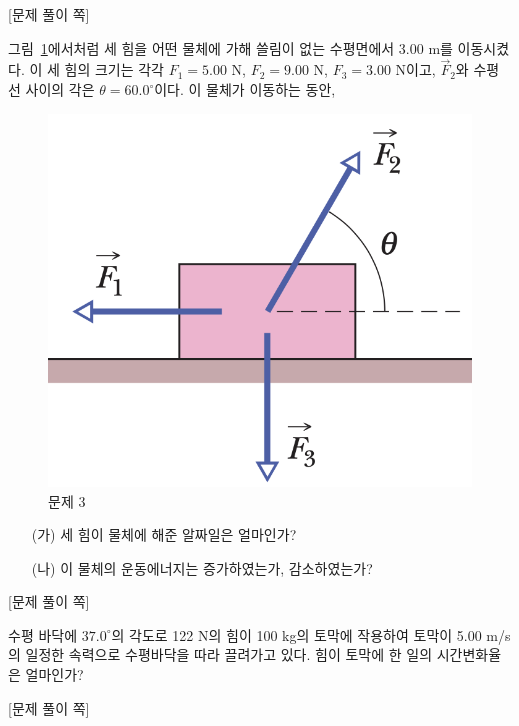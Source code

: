 \documentclass[floatfix,nofootinbib,superscriptaddress,fleqn,preprint]{revtex4}
\begin{document}
\newpage

{\color{gray} [문제 풀이 쪽]}

\newpage 

그림~\ref{fig:3}에서처럼 세 힘을 어떤 물체에 가해 쓸림이 없는
수평면에서 3.00 m를 이동시켰다. 이 세 힘의 크기는 각각
$F_1=5.00$ N, $F_2=9.00$ N, $F_3=3.00$ N이고, $\vec{F}_2$와 수평선 
사이의 각은 $\theta=60.0^\circ$이다. 이 물체가 이동하는 동안, 
\begin{figure}[ht]
  \centering
\includegraphics[scale=0.45]{Qfig7-3-20220323.png}  
  \caption{문제 3}
  \label{fig:3}
\end{figure}
\begin{itemize}
\item[(가)] 세 힘이 물체에 해준 알짜일은 얼마인가?
\item[(나)] 이 물체의 운동에너지는 증가하였는가, 감소하였는가?
\end{itemize}
\newpage

{\color{gray} [문제 풀이 쪽]}

\newpage

수평 바닥에 $37.0^\circ$의 각도로 122 N의 힘이 100 kg의 토막에
작용하여 토막이 5.00 m/s의 일정한 속력으로 수평바닥을 따라 끌려가고
있다. 힘이 토막에 한 일의 시간변화율은 얼마인가?

\newpage

{\color{gray} [문제 풀이 쪽]}

\newpage
\end{document}

